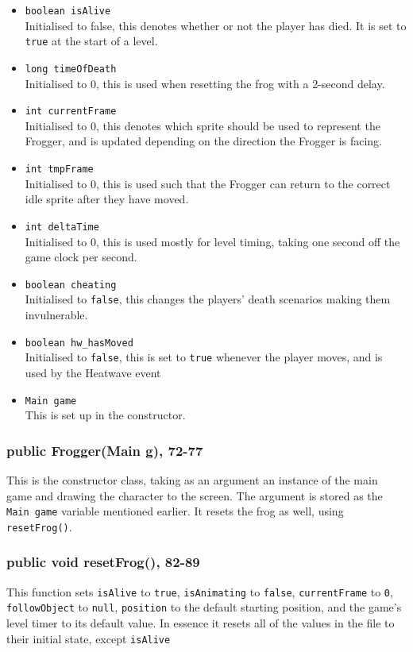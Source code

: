 \documentclass[12pt]{article}
\begin{document}
\begin{itemize}
  \item \verb|boolean isAlive|\\
    Initialised to false, this denotes whether or not the player has died. It is set to \verb|true| at the start of a level.
  \item \verb|long timeOfDeath|\\
    Initialised to 0, this is used when resetting the frog with a 2-second delay.
  \item \verb|int currentFrame|\\
    Initialised to 0, this denotes which sprite should be used to represent the Frogger, and is updated depending on the direction the Frogger is facing.
  \item \verb|int tmpFrame|\\
    Initialised to 0, this is used such that the Frogger can return to the correct idle sprite after they have moved.
  \item \verb|int deltaTime|\\
    Initialised to 0, this is used mostly for level timing, taking one second off the game clock per second.
  \item \verb|boolean cheating|\\
    Initialised to \verb|false|, this changes the players' death scenarios making them invulnerable.
  \item \verb|boolean hw_hasMoved|\\
    Initialised to \verb|false|, this is set to \verb|true| whenever the player moves, and is used by the Heatwave event
  \item \verb|Main game|\\
    This is set up in the constructor.
\end{itemize}

\subsubsection{public Frogger(Main g), 72-77}
This is the constructor class, taking as an argument an instance of the main game and drawing the character to the screen.
The argument is stored as the \verb|Main game| variable mentioned earlier.
It resets the frog as well, using \verb|resetFrog()|.

\subsubsection{public void resetFrog(), 82-89}
This function sets \verb|isAlive| to \verb|true|, \verb|isAnimating| to \verb|false|, \verb|currentFrame| to \verb|0|, \verb|followObject| to \verb|null|, \verb|position| to the default starting position, and the game's level timer to its default value.
In essence it resets all of the values in the file to their initial state, except \verb|isAlive|
\end{document}
